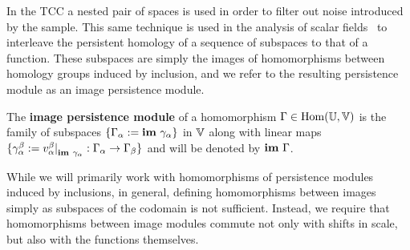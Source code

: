 

In the TCC a nested pair of spaces is used in order to filter out noise introduced by the sample.
This same technique is used in the analysis of scalar fields~\cite{chazal09analysis} to interleave the persistent homology of a sequence of subspaces to that of a function.
These subspaces are simply the images of homomorphisms between homology groups induced by inclusion, and we refer to the resulting persistence module as an image persistence module.

\begin{definition}
  The \textbf{image persistence module} of a homomorphism $\Gamma\in\mathrm{Hom}(\mathbb{U},\mathbb{V})$ is the family of subspaces $\{\Gamma_\alpha :=\mathbf{im}~\gamma_\alpha\}$ in $\mathbb{V}$ along with linear maps $\{\gamma_\alpha^\beta := v_\alpha^\beta\mathord{\mid}_{\mathbf{im}~\gamma_\alpha} : \Gamma_\alpha\to\Gamma_\beta\}$ and will be denoted by $\mathbf{im}~\Gamma$.
\end{definition}

While we will primarily work with homomorphisms of persistence modules induced by inclusions, in general, defining homomorphisms between images simply as subspaces of the codomain is not sufficient.
Instead, we require that homomorphisms between image modules commute not only with shifts in scale, but also with the functions themselves.

